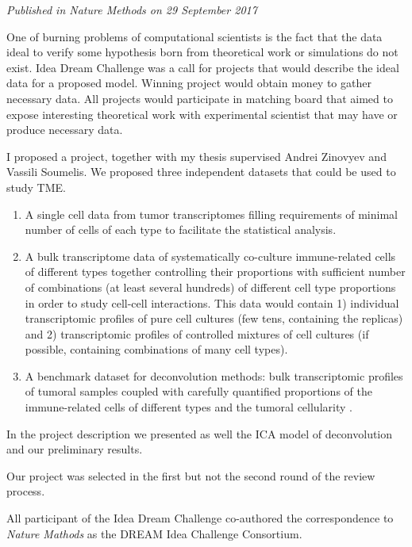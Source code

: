 \documentclass[12pt,]{book}
\providecommand{\tightlist}{%
  \setlength{\itemsep}{0pt}\setlength{\parskip}{0pt}}
\theoremstyle{definition}
\theoremstyle{definition}
\theoremstyle{definition}
\theoremstyle{remark}
\begin{document}
\emph{Published in Nature Methods on 29 September 2017}

One of burning problems of computational scientists is the fact that the
data ideal to verify some hypothesis born from theoretical work or
simulations do not exist. Idea Dream Challenge was a call for projects
that would describe the ideal data for a proposed model. Winning project
would obtain money to gather necessary data. All projects would
participate in matching board that aimed to expose interesting
theoretical work with experimental scientist that may have or produce
necessary data.

I proposed a project, together with my thesis supervised Andrei Zinovyev
and Vassili Soumelis. We proposed three independent datasets that could
be used to study TME.

\begin{enumerate}
\def\labelenumi{\arabic{enumi}.}
\tightlist
\item
  A single cell data from tumor transcriptomes filling requirements of
  minimal number of cells of each type to facilitate the statistical
  analysis.
\item
  A bulk transcriptome data of systematically co-culture immune-related
  cells of different types together controlling their proportions with
  sufficient number of combinations (at least several hundreds) of
  different cell type proportions in order to study cell-cell
  interactions. This data would contain 1) individual transcriptomic
  profiles of pure cell cultures (few tens, containing the replicas) and
  2) transcriptomic profiles of controlled mixtures of cell cultures (if
  possible, containing combinations of many cell types).
\item
  A benchmark dataset for deconvolution methods: bulk transcriptomic
  profiles of tumoral samples coupled with carefully quantified
  proportions of the immune-related cells of different types and the
  tumoral cellularity .
\end{enumerate}

In the project description we presented as well the ICA model of
deconvolution and our preliminary results.

Our project was selected in the first but not the second round of the
review process.

All participant of the Idea Dream Challenge co-authored the
correspondence to \emph{Nature Mathods} as the DREAM Idea Challenge
Consortium.


\end{document}
